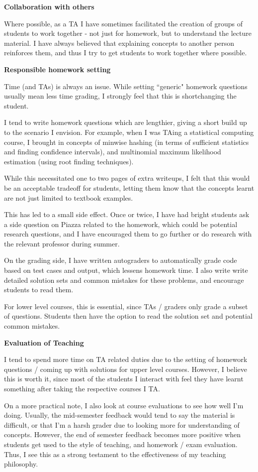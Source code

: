 \documentclass[a4paper,12pt]{article}
\begin{document}
{\bf Collaboration with others}

Where possible, as a TA I have sometimes facilitated the creation of groups of students to work together - not just for homework, but to understand the lecture material. I have always believed that explaining concepts to another person reinforces them, and thus I try to get students to work together where possible.

{\bf Responsible homework setting}

Time (and TAs) is always an issue. While setting ``generic" homework questions usually mean less time grading, I strongly feel that this is shortchanging the student.

I tend to write homework questions which are lengthier, giving a short build up to the scenario I envision. For example, when I was TAing a statistical computing course, I brought in concepts of minwise hashing (in terms of sufficient statistics and finding confidence intervals), and multinomial maximum likelihood estimation (using root finding techniques).

While this necessitated one to two pages of extra writeups, I felt that this would be an acceptable tradeoff for students, letting them know that the concepts learnt are not just limited to textbook examples.

This has led to a small side effect. Once or twice, I have had bright students ask a side question on Piazza related to the homework, which could be potential research questions, and I have encouraged them to go further or do research with the relevant professor during summer.

On the grading side, I have written autograders to automatically grade code based on test cases and output, which lessens homework time. I also write write detailed solution sets and common mistakes for these problems, and encourage students to read them.

For lower level courses, this is essential, since TAs / graders only grade a subset of questions. Students then have the option to read the solution set and potential common mistakes. 

{\bf Evaluation of Teaching}

I tend to spend more time on TA related duties due to the setting of homework questions / coming up with solutions for upper level courses. However, I believe this is worth it, since most of the students I interact with feel they have learnt something after taking the respective courses I TA.

On a more practical note, I also look at course evaluations to see how well I'm doing. Usually, the mid-semester feedback would tend to say the material is difficult, or that I'm a harsh grader due to looking more for understanding of concepts. However, the end of semester feedback becomes more positive when students get used to the style of teaching, and homework / exam evaluation. Thus, I see this as a strong testament to the effectiveness of my teaching philosophy. 
\end{document}
